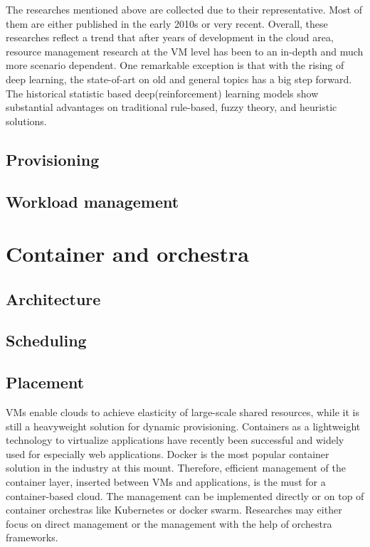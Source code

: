 \documentclass[sigchi]{acmart}
\begin{document}
The researches mentioned above are collected due to their representative. Most of them are either published in the early 2010s or very recent.
Overall, these researches reflect a trend that after years of development in the cloud area, resource management research at the VM level has been to an in-depth and much more scenario dependent.
One remarkable exception is that with the rising of deep learning, the state-of-art on old and general topics has a big step forward.
The historical statistic based deep(reinforcement) learning models show substantial advantages on traditional rule-based, fuzzy theory, and heuristic solutions.

\subsection{Provisioning}

\subsection{Workload management}


\section{Container and orchestra}
\subsection{Architecture}
\subsection{Scheduling}
\subsection{Placement}
VMs enable clouds to achieve elasticity of large-scale shared resources, while it is still a heavyweight solution for dynamic provisioning.
Containers as a lightweight technology to virtualize applications have recently been successful and widely used for especially web applications.
Docker is the most popular container solution in the industry at this mount. Therefore, efficient management of the container layer, inserted between VMs and applications, is the must for a container-based cloud.
The management can be implemented directly or on top of container orchestras like Kubernetes or docker swarm.
Researches may either focus on direct management or the management with the help of orchestra frameworks.
\end{document}
